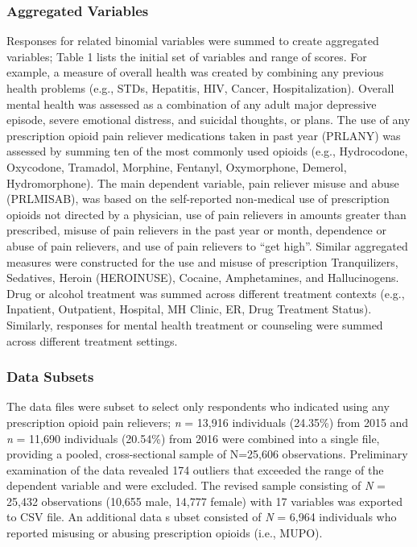 \documentclass[sigconf]{acmart}
\begin{document}
\subsubsection{Aggregated Variables} 

Responses for related binomial variables were summed to create aggregated 
variables; Table 1 lists the initial set of variables and range of scores. 
For example, a measure of overall health was created by combining any previous 
health problems (e.g., STDs, Hepatitis, HIV, Cancer, Hospitalization). Overall 
mental health was assessed as a combination of any adult major depressive 
episode, severe emotional distress, and suicidal thoughts, or plans. The use of 
any prescription opioid pain reliever medications taken in past year (PRLANY) 
was assessed by summing ten of the most commonly used opioids (e.g., Hydrocodone, 
Oxycodone, Tramadol, Morphine, Fentanyl, Oxymorphone, Demerol, Hydromorphone). 
The main dependent variable, pain reliever misuse and abuse (PRLMISAB), was 
based on the self-reported non-medical use of prescription opioids not directed 
by a physician, use of pain relievers in amounts greater than prescribed, 
misuse of pain relievers in the past year or month, dependence or abuse of 
pain relievers, and use of pain relievers to ``get high''. Similar aggregated 
measures were constructed for the use and misuse of prescription Tranquilizers, 
Sedatives, Heroin (HEROINUSE), Cocaine, Amphetamines, and Hallucinogens. Drug 
or alcohol treatment was summed across different treatment contexts (e.g., 
Inpatient, Outpatient, Hospital, MH Clinic, ER, Drug Treatment Status). 
Similarly, responses for mental health treatment or counseling were summed
across different treatment settings. 


\subsubsection{Data Subsets} 
 
The data files were subset to select only respondents who indicated using
any prescription opioid pain relievers; \textit{n} = 13,916 individuals 
(24.35\%) from 2015 and \textit{n} = 11,690 individuals (20.54\%) from 2016 
were combined into a single file, providing a pooled, cross-sectional sample 
of N=25,606 observations. Preliminary examination of the data revealed 174 
outliers that exceeded the range of the dependent variable and were excluded. 
The revised sample consisting of \textit{N} = 25,432 observations (10,655 male, 
14,777 female) with 17 variables was exported to CSV file. An additional data s
ubset consisted of \textit{N} = 6,964 individuals who reported misusing or 
abusing prescription opioids (i.e., MUPO). 
\end{document}
